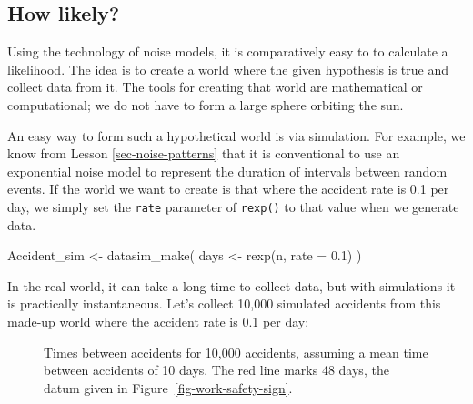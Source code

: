 \documentclass[
  letterpaper,
  DIV=11,
  numbers=noendperiod,
  oneside]{scrartcl}
\newenvironment{Shaded}{\begin{snugshade}}{\end{snugshade}}
\newcommand{\AttributeTok}[1]{\textcolor[rgb]{0.40,0.45,0.13}{#1}}
\newcommand{\FloatTok}[1]{\textcolor[rgb]{0.68,0.00,0.00}{#1}}
\newcommand{\FunctionTok}[1]{\textcolor[rgb]{0.28,0.35,0.67}{#1}}
\newcommand{\NormalTok}[1]{\textcolor[rgb]{0.00,0.23,0.31}{#1}}
\newcommand{\OtherTok}[1]{\textcolor[rgb]{0.00,0.23,0.31}{#1}}
\begin{document}
\subsection{How likely?}\label{how-likely}

Using the technology of noise models, it is comparatively easy to to
calculate a likelihood. The idea is to create a world where the given
hypothesis is true and collect data from it. The tools for creating that
world are mathematical or computational; we do not have to form a large
sphere orbiting the sun.

An easy way to form such a hypothetical world is via simulation. For
example, we know from Lesson \ref{sec-noise-patterns} that it is
conventional to use an exponential noise model to represent the duration
of intervals between random events. If the world we want to create is
that where the accident rate is 0.1 per day, we simply set the
\texttt{rate} parameter of \texttt{rexp()} to that value when we
generate data.

\begin{Shaded}
\begin{Highlighting}[]
\NormalTok{Accident\_sim }\OtherTok{\textless{}{-}} \FunctionTok{datasim\_make}\NormalTok{(}
\NormalTok{  days }\OtherTok{\textless{}{-}} \FunctionTok{rexp}\NormalTok{(n, }\AttributeTok{rate =} \FloatTok{0.1}\NormalTok{)}
\NormalTok{)}
\end{Highlighting}
\end{Shaded}

In the real world, it can take a long time to collect data, but with
simulations it is practically instantaneous. Let's collect 10,000
simulated accidents from this made-up world where the accident rate is
0.1 per day:

\begin{figure}


\caption{\label{fig-ten-day-rate}Times between accidents for 10,000
accidents, assuming a mean time between accidents of 10 days. The red
line marks 48 days, the datum given in
Figure~\ref{fig-work-safety-sign}.}

\end{figure}%
\end{document}
